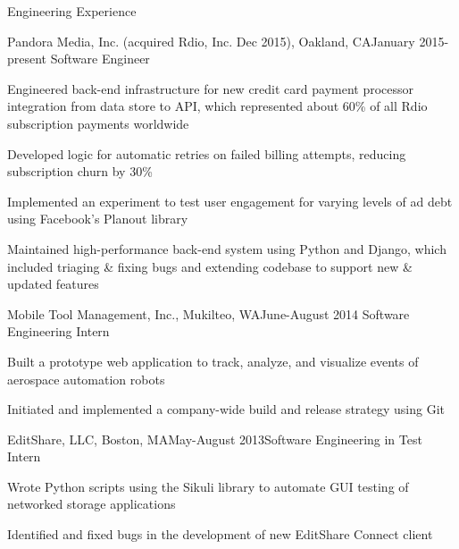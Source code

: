 \documentclass{resume} %
\begin{document}

\begin{rSection}{Engineering Experience}

\begin{rSubsection}{Pandora Media, Inc. (acquired Rdio, Inc. Dec 2015), Oakland, CA}{January 2015-present} {Software Engineer}

\item Engineered back-end infrastructure for new credit card payment processor integration from data store to API, which represented about 60\% of all Rdio subscription payments worldwide
\item Developed logic for automatic retries on failed billing attempts, reducing subscription churn by 30\%
\item Implemented an experiment to test user engagement for varying levels of ad debt using Facebook's Planout library
\item Maintained high-performance back-end system using Python and Django, which included triaging \& fixing bugs and extending codebase to support new \& updated features
\end{rSubsection}

\begin{rSubsection}{Mobile Tool Management, Inc., Mukilteo, WA}{June-August 2014} {Software Engineering Intern}

\item Built a prototype web application to track, analyze, and visualize events of aerospace automation robots
\item Initiated and implemented a company-wide build and release strategy using Git
\end{rSubsection}


\begin{rSubsection}{EditShare, LLC, Boston, MA}{May-August 2013}{Software Engineering in Test Intern}{}
\item Wrote Python scripts using the Sikuli library to automate GUI testing of networked storage applications
\item Identified and fixed bugs in the development of new EditShare Connect client
\end{rSubsection}

\end{rSection}
\end{document}

